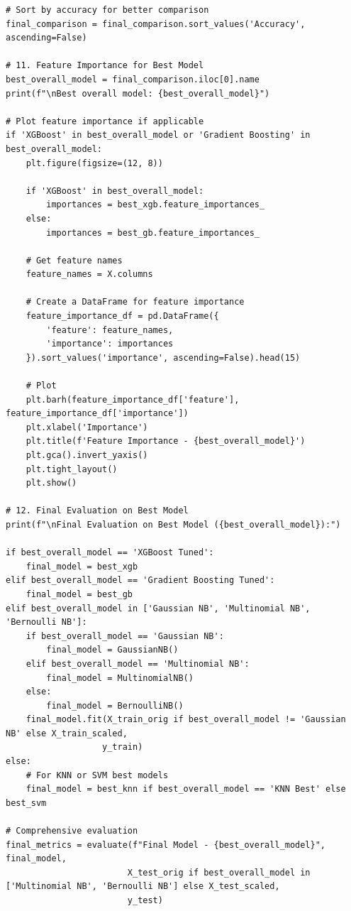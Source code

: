 \documentclass[12pt]{article}
\begin{document}
\begin{verbatim}
# Sort by accuracy for better comparison
final_comparison = final_comparison.sort_values('Accuracy', ascending=False)

# 11. Feature Importance for Best Model
best_overall_model = final_comparison.iloc[0].name
print(f"\nBest overall model: {best_overall_model}")

# Plot feature importance if applicable
if 'XGBoost' in best_overall_model or 'Gradient Boosting' in best_overall_model:
    plt.figure(figsize=(12, 8))
    
    if 'XGBoost' in best_overall_model:
        importances = best_xgb.feature_importances_
    else:
        importances = best_gb.feature_importances_
    
    # Get feature names
    feature_names = X.columns
    
    # Create a DataFrame for feature importance
    feature_importance_df = pd.DataFrame({
        'feature': feature_names,
        'importance': importances
    }).sort_values('importance', ascending=False).head(15)
    
    # Plot
    plt.barh(feature_importance_df['feature'], feature_importance_df['importance'])
    plt.xlabel('Importance')
    plt.title(f'Feature Importance - {best_overall_model}')
    plt.gca().invert_yaxis()
    plt.tight_layout()
    plt.show()

# 12. Final Evaluation on Best Model
print(f"\nFinal Evaluation on Best Model ({best_overall_model}):")

if best_overall_model == 'XGBoost Tuned':
    final_model = best_xgb
elif best_overall_model == 'Gradient Boosting Tuned':
    final_model = best_gb
elif best_overall_model in ['Gaussian NB', 'Multinomial NB', 'Bernoulli NB']:
    if best_overall_model == 'Gaussian NB':
        final_model = GaussianNB()
    elif best_overall_model == 'Multinomial NB':
        final_model = MultinomialNB()
    else:
        final_model = BernoulliNB()
    final_model.fit(X_train_orig if best_overall_model != 'Gaussian NB' else X_train_scaled, 
                   y_train)
else:
    # For KNN or SVM best models
    final_model = best_knn if best_overall_model == 'KNN Best' else best_svm

# Comprehensive evaluation
final_metrics = evaluate(f"Final Model - {best_overall_model}", final_model, 
                        X_test_orig if best_overall_model in ['Multinomial NB', 'Bernoulli NB'] else X_test_scaled, 
                        y_test)
\end{verbatim}
\end{document}

